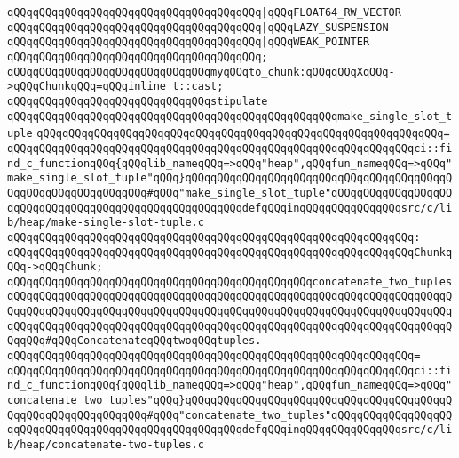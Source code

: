 \verb|qQQqqQQqqQQqqQQqqQQqqQQqqQQqqQQqqQQqqQQq|\verb#|qQQqFLOAT64_RW_VECTOR#\newline
\verb|qQQqqQQqqQQqqQQqqQQqqQQqqQQqqQQqqQQqqQQq|\verb#|qQQqLAZY_SUSPENSION#\newline
\verb|qQQqqQQqqQQqqQQqqQQqqQQqqQQqqQQqqQQqqQQq|\verb#|qQQqWEAK_POINTER#\newline
\verb|qQQqqQQqqQQqqQQqqQQqqQQqqQQqqQQqqQQqqQQq;|\newline
\newline
\verb|qQQqqQQqqQQqqQQqqQQqqQQqqQQqqQQqmyqQQqto_chunk:qQQqqQQqXqQQq->qQQqChunkqQQq=qQQqinline_t::cast;|\newline
\newline
\verb|qQQqqQQqqQQqqQQqqQQqqQQqqQQqqQQqstipulate|\newline
\verb|qQQqqQQqqQQqqQQqqQQqqQQqqQQqqQQqqQQqqQQqqQQqqQQqqQQqmake_single_slot_tuple|\newline
\verb|qQQqqQQqqQQqqQQqqQQqqQQqqQQqqQQqqQQqqQQqqQQqqQQqqQQqqQQqqQQqqQQq=|\newline
\verb|qQQqqQQqqQQqqQQqqQQqqQQqqQQqqQQqqQQqqQQqqQQqqQQqqQQqqQQqqQQqqQQqci::find_c_functionqQQq{qQQqlib_nameqQQq=>qQQq"heap",qQQqfun_nameqQQq=>qQQq"make_single_slot_tuple"qQQq}qQQqqQQqqQQqqQQqqQQqqQQqqQQqqQQqqQQqqQQqqQQqqQQqqQQqqQQqqQQqqQQq#qQQq"make_single_slot_tuple"qQQqqQQqqQQqqQQqqQQqqQQqqQQqqQQqqQQqqQQqqQQqqQQqqQQqqQQqdefqQQqinqQQqqQQqqQQqqQQqsrc/c/lib/heap/make-single-slot-tuple.c|\newline
\verb|qQQqqQQqqQQqqQQqqQQqqQQqqQQqqQQqqQQqqQQqqQQqqQQqqQQqqQQqqQQqqQQq:|\newline
\verb|qQQqqQQqqQQqqQQqqQQqqQQqqQQqqQQqqQQqqQQqqQQqqQQqqQQqqQQqqQQqqQQqChunkqQQq->qQQqChunk;|\newline
\newline
\verb|qQQqqQQqqQQqqQQqqQQqqQQqqQQqqQQqqQQqqQQqqQQqqQQqconcatenate_two_tuplesqQQqqQQqqQQqqQQqqQQqqQQqqQQqqQQqqQQqqQQqqQQqqQQqqQQqqQQqqQQqqQQqqQQqqQQqqQQqqQQqqQQqqQQqqQQqqQQqqQQqqQQqqQQqqQQqqQQqqQQqqQQqqQQqqQQqqQQqqQQqqQQqqQQqqQQqqQQqqQQqqQQqqQQqqQQqqQQqqQQqqQQqqQQqqQQqqQQqqQQqqQQqqQQqqQQqqQQq#qQQqConcatenateqQQqtwoqQQqtuples.|\newline
\verb|qQQqqQQqqQQqqQQqqQQqqQQqqQQqqQQqqQQqqQQqqQQqqQQqqQQqqQQqqQQqqQQq=|\newline
\verb|qQQqqQQqqQQqqQQqqQQqqQQqqQQqqQQqqQQqqQQqqQQqqQQqqQQqqQQqqQQqqQQqci::find_c_functionqQQq{qQQqlib_nameqQQq=>qQQq"heap",qQQqfun_nameqQQq=>qQQq"concatenate_two_tuples"qQQq}qQQqqQQqqQQqqQQqqQQqqQQqqQQqqQQqqQQqqQQqqQQqqQQqqQQqqQQqqQQqqQQq#qQQq"concatenate_two_tuples"qQQqqQQqqQQqqQQqqQQqqQQqqQQqqQQqqQQqqQQqqQQqqQQqqQQqqQQqdefqQQqinqQQqqQQqqQQqqQQqsrc/c/lib/heap/concatenate-two-tuples.c|\newline
